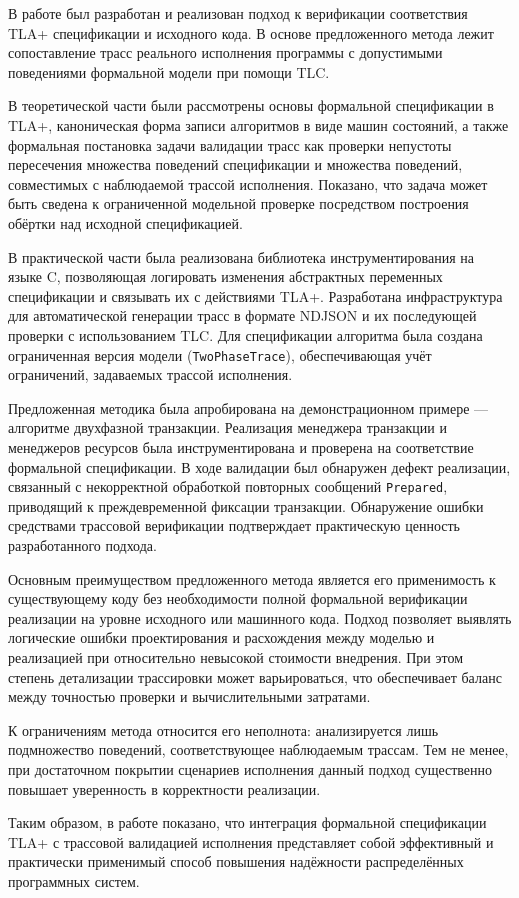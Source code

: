 \conclusion

В работе был разработан и реализован подход к верификации соответствия TLA+
спецификации и исходного кода. В основе предложенного метода лежит
сопоставление трасс реального исполнения программы с допустимыми поведениями
формальной модели при помощи TLC.

В теоретической части были рассмотрены основы формальной спецификации в TLA+,
каноническая форма записи алгоритмов в виде машин состояний, а также формальная
постановка задачи валидации трасс как проверки непустоты пересечения множества
поведений спецификации и множества поведений, совместимых с наблюдаемой трассой
исполнения. Показано, что задача может быть сведена к ограниченной модельной
проверке посредством построения обёртки над исходной спецификацией.

В практической части была реализована библиотека инструментирования на языке C,
позволяющая логировать изменения абстрактных переменных спецификации и
связывать их с действиями TLA+. Разработана инфраструктура для автоматической
генерации трасс в формате NDJSON и их последующей проверки с использованием
TLC. Для спецификации алгоритма была создана ограниченная версия модели
(\texttt{TwoPhaseTrace}), обеспечивающая учёт ограничений, задаваемых трассой
исполнения.

Предложенная методика была апробирована на демонстрационном примере — алгоритме
двухфазной транзакции. Реализация менеджера транзакции и менеджеров ресурсов
была инструментирована и проверена на соответствие формальной спецификации. В
ходе валидации был обнаружен дефект реализации, связанный с некорректной
обработкой повторных сообщений \texttt{Prepared}, приводящий к преждевременной
фиксации транзакции. Обнаружение ошибки средствами трассовой верификации
подтверждает практическую ценность разработанного подхода.

Основным преимуществом предложенного метода является его применимость к
существующему коду без необходимости полной формальной верификации реализации
на уровне исходного или машинного кода. Подход позволяет выявлять логические
ошибки проектирования и расхождения между моделью и реализацией при
относительно невысокой стоимости внедрения. При этом степень детализации
трассировки может варьироваться, что обеспечивает баланс между точностью
проверки и вычислительными затратами.

К ограничениям метода относится его неполнота: анализируется лишь подмножество
поведений, соответствующее наблюдаемым трассам. Тем не менее, при достаточном
покрытии сценариев исполнения данный подход существенно повышает уверенность в
корректности реализации.

Таким образом, в работе показано, что интеграция формальной спецификации TLA+ с
трассовой валидацией исполнения представляет собой эффективный и практически
применимый способ повышения надёжности распределённых программных систем.
